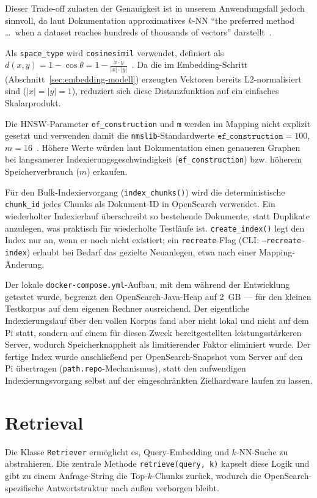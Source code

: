 Dieser Trade-off zulasten der Genauigkeit ist in unserem Anwendungsfall jedoch sinnvoll, da laut Dokumentation approximatives 
$k$-NN \enquote{the preferred method \ldots\ when a dataset reaches hundreds of thousands of vectors} darstellt~\cite{opensearch-approximate-knn}.

Als \texttt{space\_type} wird \texttt{cosinesimil} verwendet, definiert als 
$d(x,y) = 1-\cos\theta = 1 - \frac{x\cdot y}{|x|\cdot|y|}$~\cite{opensearch-spaces}. Da die im Embedding-Schritt (Abschnitt~\ref{sec:embedding-modell})
erzeugten Vektoren bereits L2-normalisiert sind ($|x|=|y|=1$), reduziert sich diese Distanzfunktion auf ein einfaches Skalarprodukt.

Die HNSW-Parameter \texttt{ef\_construction} und \texttt{m} werden im Mapping nicht explizit gesetzt und verwenden damit die \texttt{nmslib}-Standardwerte
$\texttt{ef\_construction}=100$, $m=16$~\cite{opensearch-methods-engines}. Höhere Werte würden laut Dokumentation einen genaueren Graphen bei langsamerer
Indexierungsgeschwindigkeit (\texttt{ef\_construction}) bzw. höherem Speicherverbrauch ($m$) erkaufen. 

Für den Bulk-Indexiervorgang (\texttt{index\_chunks()}) wird die deterministische
\texttt{chunk\_id} jedes Chunks als Dokument-ID in OpenSearch verwendet.
Ein wiederholter Indexierlauf überschreibt so bestehende Dokumente, statt
Duplikate anzulegen, was praktisch für wiederholte Testläufe ist. \texttt{create\_index()} legt den Index nur an, wenn er noch nicht existiert; ein \texttt{recreate}-Flag
(CLI: \texttt{--recreate-index}) erlaubt bei Bedarf das gezielte Neuanlegen, etwa nach einer Mapping-Änderung.

Der lokale \texttt{docker-compose.yml}-Aufbau, mit dem während der Entwicklung getestet wurde, begrenzt den OpenSearch-Java-Heap auf 2~GB — für den 
kleinen Testkorpus auf dem eigenen Rechner ausreichend. Der eigentliche Indexierungslauf über den vollen Korpus fand aber nicht lokal und nicht auf 
dem Pi statt, sondern auf einem für diesen Zweck bereitgestellten leistungsstärkeren Server, wodurch Speicherknappheit als limitierender Faktor
eliminiert wurde. Der fertige Index wurde anschließend per OpenSearch-Snapshot vom Server auf den Pi übertragen (\texttt{path.repo}-Mechanismus), 
statt den aufwendigen Indexierungsvorgang selbst auf der eingeschränkten Zielhardware laufen zu lassen.

\section{Retrieval}
Die Klasse \texttt{Retriever} ermöglicht es, Query-Embedding und $k$-NN-Suche zu abstrahieren. Die zentrale Methode
\texttt{retrieve(query, k)} kapselt diese Logik und gibt zu einem Anfrage-String die Top-$k$-Chunks zurück, wodurch die
OpenSearch-spezifische Antwortstruktur nach außen verborgen bleibt.


